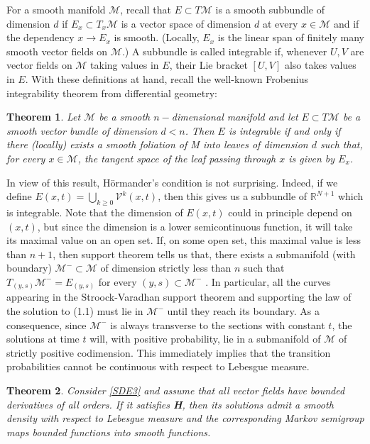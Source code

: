 \documentclass[twoside, 12pt]{book}
\numberwithin{equation}{chapter}
\newtheorem{theorem}{Theorem}[section]
\def\cM{{\mathcal M}}
\def\mR{{\mathbb R}}
\def\sV{{\mathscr V}}
\def\geq{\geqslant}
\begin{document}
	For a smooth manifold $\cM$, recall that $E \subset T\cM$ is a smooth subbundle of dimension $d$ if $E_x \subset T_x\cM$ is a vector space of dimension $d$ at every $x \in \cM$ and if the dependency $x \to E_x$ is smooth. (Locally, $E_x$ is the linear span of finitely many smooth vector fields on $\cM$.) A subbundle is called integrable if, whenever $U, V$ are vector fields on $\cM$ taking values in $E$, their Lie bracket $[U, V ]$ also takes values in $E$.
	With these definitions at hand, recall the well-known Frobenius integrability theorem from differential geometry:
	\begin{theorem}
		Let $\cM $ be a smooth $n-$dimensional manifold and let $E \subset T \cM$ be a smooth vector bundle of dimension $d < n$. Then $E $ is integrable if and only if there (locally) exists a smooth foliation of M into leaves of dimension $d$ such that, for every $x\in  \cM$, the tangent space of the leaf passing through $x$ is given by $E_x$.
		
	\end{theorem}
	
	In view of this result, H\"ormander’s condition is not surprising. Indeed, if we define $E(x,t) = \bigcup_{k\geq 0} \sV^k(x,t)$, then this gives us a subbundle of $\mR^{N+1}$ which
	is integrable. Note that the dimension of $E(x,t)$ could in principle depend on $(x, t)$, but since the dimension is a lower semicontinuous function, it will take its maximal value on an open set. If, on some open set, this maximal value is less than $n + 1$, then support theorem tells us that, there exists a submanifold (with boundary) $\cM^- \subset \cM$ of dimension strictly less than $n$ such that $T_{(y,s)}\cM^- = E_{(y,s)}$ for every $(y, s) \subset \cM^-$ . In particular, all the curves appearing in the Stroock-Varadhan support theorem and supporting the law of the solution to (1.1) must lie in $\cM^-$ until they reach its boundary. As a consequence, since $\cM^-$ is always transverse to the sections with constant $t$, the solutions at time $t$ will, with positive probability, lie in a submanifold of $\cM$ of strictly positive codimension. This immediately implies that the transition probabilities cannot be continuous with respect to Lebesgue measure.
	
	\begin{theorem}
	Consider \eqref{SDE3} and assume that all vector fields have bounded derivatives of all orders. If it satisfies \textbf{H}, then its solutions admit a smooth density with respect to Lebesgue measure and the corresponding Markov semigroup maps bounded functions into smooth functions.
	\end{theorem}
	
\end{document}
